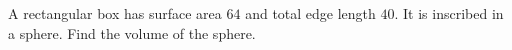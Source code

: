 A rectangular box has surface area $64$ and total edge length $40$. It is inscribed in a sphere. Find the volume of the sphere.
